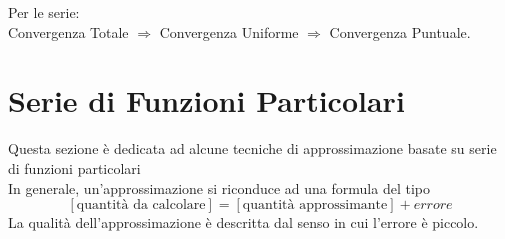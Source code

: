 \observation
Per le serie:\\
Convergenza Totale $\Rightarrow$ Convergenza Uniforme $\Rightarrow$ Convergenza Puntuale.

\section{Serie di Funzioni Particolari}
Questa sezione è dedicata ad alcune tecniche di approssimazione  basate su serie di funzioni particolari\\
In generale, un'approssimazione si riconduce ad una formula del tipo\\
$$\left[\text{quantità da calcolare}\right]=\left[\text{quantità approssimante}\right]+ errore$$
La qualità dell'approssimazione è descritta dal senso in cui l'errore è piccolo.\\
